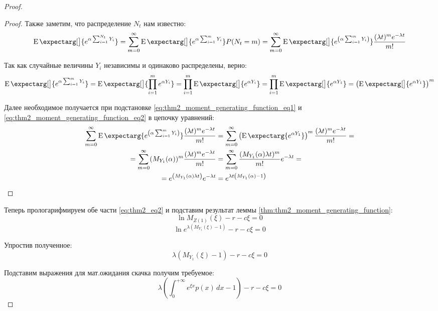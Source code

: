 \documentclass[a4paper,12pt]{article}
\theoremstyle{definition}
\newcommand{\expect}{\operatorname{E}\expectarg}
\begin{document}
\begin{proof}
\begin{proof}
Также заметим, что распределение $N_t$ нам известно:
\begin{equation}\label{eq:thm2_moment_generating_function_eq1}
     \expect[\big]{e^{\alpha \sum_{i=1}^{N_t} Y_i}} = \sum_{m=0}^{\infty} \expect[\big]{e^{\alpha \sum_{i=1}^{m} Y_i}} P(N_t = m) = \sum_{m=0}^{\infty} \expect[\big]{e^{\left(\alpha \sum_{i=1}^{m} Y_i\right)}} \frac{(\lambda t)^{m} e^{-\lambda t}}{m!}
\end{equation}

Так как случайные величины $Y_i$ независимы и одинаково распределены, верно:
\begin{equation}\label{eq:thm2_moment_generating_function_eq2}
     \expect[\big]{e^{\alpha \sum_{i=1}^{m} Y_i}} = \expect[\big]{\prod_{i=1}^{m} e^{\alpha Y_i}} = \prod_{i=1}^{m}  \expect[\big]{e^{\alpha Y_i}} = \prod_{i=1}^{m}  \expect[\big]{e^{\alpha Y_1}} = \left( \expect[\big]{e^{\alpha Y_1}} \right)^{m}
\end{equation}

Далее необходимое получается при подстановке \eqref{eq:thm2_moment_generating_function_eq1} и \eqref{eq:thm2_moment_generating_function_eq2} в цепочку уравнений:
\begin{equation*}
\begin{split}
    \sum_{m=0}^{\infty} \expect{e^{\left(\alpha \sum_{i=1}^{m} Y_i\right)}} \frac{(\lambda t)^{m} e^{-\lambda t}}{m!} &= \sum_{m=0}^{\infty} \left(\expect{e^{\alpha Y_1}}\right)^{m} \frac{(\lambda t)^{m} e^{-\lambda t}}{m!} =\\
    = \sum_{m=0}^{\infty} (M_{Y_1} (\alpha))^{m} \frac{(\lambda t)^{m} e^{-\lambda t}}{m!} &= \sum_{m=0}^{\infty} \frac{(M_{Y_1} (\alpha) \lambda t)^{m}}{m!} e^{-\lambda t} =\\
    = e^{\left(M_{Y_1} (\alpha) \lambda t\right)} e^{-\lambda t} &= e^{\lambda t \left(M_{Y_1}(\alpha) - 1\right)}
\end{split}
\end{equation*}
\end{proof}

Теперь прологарифмируем обе части \eqref{eq:thm2_eq2} и подставим результат леммы  \ref{thm:thm2_moment_generating_function}:
\begin{equation*}
\ln{M_{Z(1)}(\xi)} - r - c\xi = 0
\end{equation*}
\begin{equation*}
\ln{e^{\lambda (M_{Y_1}(\xi) - 1)}} - r - c\xi = 0
\end{equation*}

Упростив полученное:
\begin{equation*}
\lambda \left(M_{Y_1}(\xi) - 1\right) - r - c\xi = 0
\end{equation*}

Подставим выражения для мат.ожидания скачка получим требуемое:
\begin{equation*}
\lambda \left(\int_{0}^{+\infty} e^{\xi x} p(x) \,dx - 1\right) - r - c\xi = 0
\end{equation*}
\end{proof}
\end{document}
